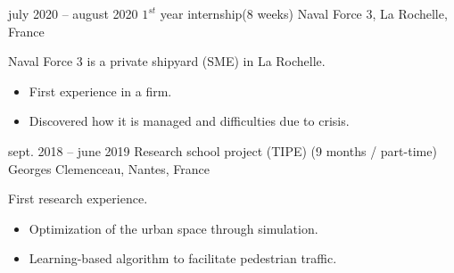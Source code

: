 \documentclass[
	a4paper,
]{fortysecondscv}
\begin{document}
\newpage
\makebacksidebar
{}
\begin{cvtable}[2]
	\cvitem
    	{july 2020 -- august 2020}
    	{$1^{st}$ year internship\newline (8 weeks)}
    	{Naval Force 3, La Rochelle, France}
    	{
	        Naval Force 3 is a private shipyard (SME) in La Rochelle.
    	    \begin{itemize}
            	\item First experience in a firm.
            	\item Discovered how it is managed and difficulties due to crisis.
    	    \end{itemize}
			\newline
    	}
	\cvitem
    	{sept. 2018 -- june 2019}
    	{Research school project (TIPE) \newline (9 months / part-time)}
    	{Georges Clemenceau, Nantes, France}
    	 {
            First research experience.
    	    \begin{itemize}
            	\item Optimization of the urban space through simulation.
            	\item Learning-based algorithm to facilitate pedestrian traffic.
    	    \end{itemize}
			\newline
    	}
\end{cvtable}
\end{document}
